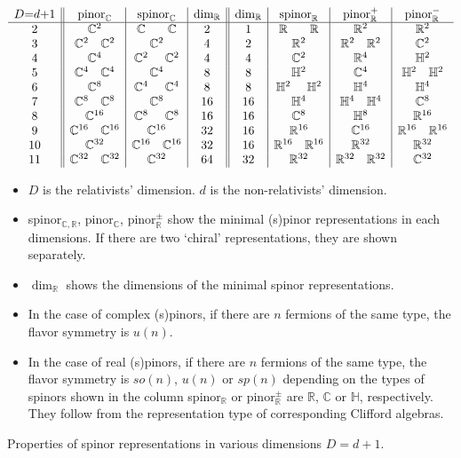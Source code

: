 \documentclass[12pt]{article}
\numberwithin{equation}{section}
\numberwithin{figure}{section}
\theoremstyle{remark}
\renewenvironment{table}[1][]{
  \begin{originaltable}[#1]
    \begin{mdframed}[linecolor=black!0,backgroundcolor=black!1]
}{
    \end{mdframed}
  \end{originaltable}
}
\def\bC{\mathbb{C}}
\def\bH{\mathbb{H}}
\def\bR{\mathbb{R}}
\begin{document}
\begin{table}
\[
\begin{array}{c||c|cc|c||c|cc|c|c}
D{=}d{+}1
& \text{pinor}_\bC
& \multicolumn{2}{c|}{\text{spinor}_\bC}
 &\dim_\bR 
&\dim_\bR
& \multicolumn{2}{c|}{\text{spinor}_\bR}
&  \text{pinor}_\bR^+ 
&  \text{pinor}_\bR^- 
 \\
\hline
2 & \bC^2 & \bC & \bC & 2 &1& \bR & \bR & \bR^2 & \bR^2\\
3 & \bC^2\quad \bC^2 &\multicolumn{2}{c|}{\bC^2} & 4 &2 &  \multicolumn{2}{c|}{\bR^2} & \bR^2\quad \bR^2 & \bC^2 \\
4 & \bC^4 & \bC^2 & \bC^2 & 4 & 4& \multicolumn{2}{c|}{\bC^2} & \bR^4 & \bH^2\\
5 & \bC^4 \quad \bC^4& \multicolumn{2}{c|}{\bC^4} & 8 &  8& \multicolumn{2}{c|}{\bH^2} & \bC^4 & \bH^2 \quad \bH^2\\
6 & \bC^8 & \bC^4 & \bC^4 & 8 & 8 & \bH^2 & \bH^2 & \bH^4 & \bH^4\\
7 & \bC^8 \quad \bC^8 & \multicolumn{2}{c|}{\bC^8} & 16 &  16& \multicolumn{2}{c|}{\bH^4} & \bH^4\quad \bH^4 & \bC^8\\
8 & \bC^{16} & \bC^8 & \bC^8 & 16  &  16& \multicolumn{2}{c|}{\bC^8}  & \bH^8 & \bR^{16}\\
9 & \bC^{16} \quad \bC^{16} &\multicolumn{2}{c|}{\bC^{16}} & 32  &  16& \multicolumn{2}{c|}{\bR^{16}} &\bC^{16} & \bR^{16}\quad \bR^{16}  \\
10 & \bC^{32} & \bC^{16} & \bC^{16} & 32  &   16& \bR^{16}  & \bR^{16} & \bR^{32} & \bR^{32}\\
11 & \bC^{32} \quad\bC^{32}& \multicolumn{2}{c|}{\bC^{32}} & 64 & 32& \multicolumn{2}{c|}{\bR^{32}} & \bR^{32}\quad\bR^{32} & \bC^{32}\\
\end{array}
\]
\begin{itemize}
\item $D$ is the relativists' dimension. $d$ is the non-relativists' dimension.
\item spinor$_{\bC,\bR}$, pinor$_\bC$, pinor$_\bR^\pm$ show the minimal (s)pinor representations in each dimensions.
If there are two `chiral' representations,  they are shown separately. 
\item $\dim_{\bR}$ shows the dimensions of the minimal spinor representations.
\item In the case of complex (s)pinors, if there are $n$ fermions of the same type, the flavor symmetry is $u(n)$.
\item In the case of real (s)pinors, if there are $n$ fermions of the same type,
 the flavor symmetry is $so(n)$, $u(n)$ or $sp(n)$
 depending on the types of spinors shown in the column spinor$_\bR$ or pinor$_\bR^\pm$ are
$\bR$, $\bC$ or $\bH$, respectively.
They follow from the representation type of corresponding Clifford algebras.
\end{itemize}
\caption{Properties of spinor representations in various dimensions $D=d+1$.
\label{tab:spinors}}
\end{table}
\end{document}

